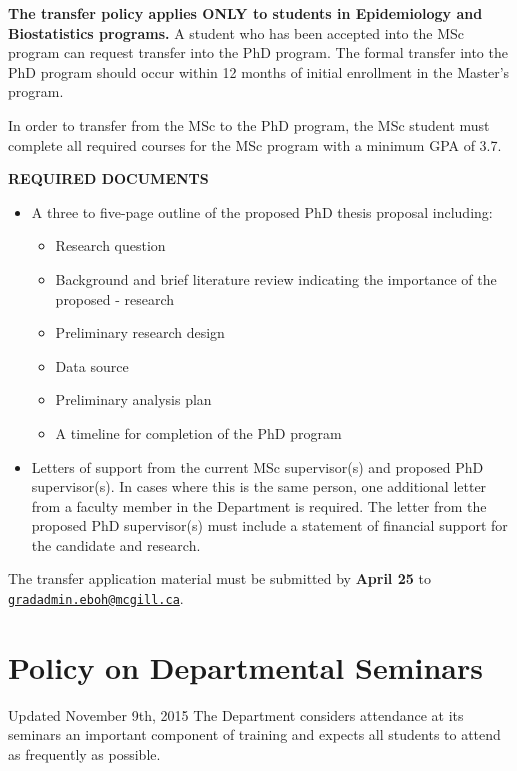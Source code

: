 \documentclass[
  openany]{book}
\providecommand{\tightlist}{%
  \setlength{\itemsep}{0pt}\setlength{\parskip}{0pt}}
\begin{document}
\textbf{The transfer policy applies ONLY to students in Epidemiology and Biostatistics programs.} A student who has been accepted into the MSc program can request transfer into the PhD program. The formal transfer into the PhD program should occur within 12 months of initial enrollment in the Master's program.

In order to transfer from the MSc to the PhD program, the MSc student must complete all required courses for the MSc program with a minimum GPA of 3.7.

\textbf{REQUIRED DOCUMENTS}

\begin{itemize}
\tightlist
\item
  A three to five-page outline of the proposed PhD thesis proposal including:

  \begin{itemize}
  \tightlist
  \item
    Research question
  \item
    Background and brief literature review indicating the importance of the proposed - research
  \item
    Preliminary research design
  \item
    Data source
  \item
    Preliminary analysis plan
  \item
    A timeline for completion of the PhD program\\
  \end{itemize}
\item
  Letters of support from the current MSc supervisor(s) and proposed PhD supervisor(s). In cases where this is the same person, one additional letter from a faculty member in the Department is required. The letter from the proposed PhD supervisor(s) must include a statement of financial support for the candidate and research.
\end{itemize}

The transfer application material must be submitted by \textbf{April 25} to \href{mailto:gradadmin.eboh@mcgill.ca}{\nolinkurl{gradadmin.eboh@mcgill.ca}}.

\hypertarget{policy-on-departmental-seminars}{%
\section{Policy on Departmental Seminars}\label{policy-on-departmental-seminars}}

Updated November 9th, 2015
The Department considers attendance at its seminars an important component of training and expects all students to attend as frequently as possible.
\end{document}
